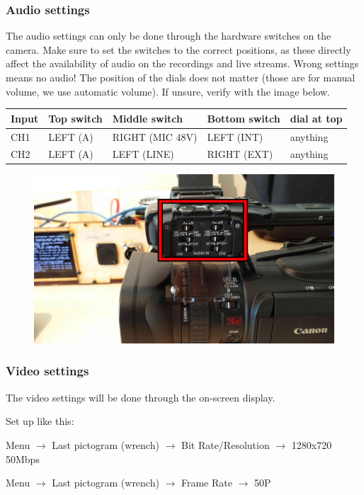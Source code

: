 \documentclass{article}
\begin{document}
\subsubsection{Audio settings}
The audio settings can only be done through the hardware switches on the camera.
Make sure to set the switches to the correct positions, as these directly affect the availability of audio on the recordings and live streams. Wrong settings means no audio!
The position of the dials does not matter (those are for manual volume, we use automatic volume).
If unsure, verify with the image below.

\begin{tabular}{| l || l | l | l | l |}
Input & Top switch & Middle switch & Bottom switch & dial at top \\ \hline
CH1 & LEFT (A) & RIGHT (MIC 48V) & LEFT (INT) & anything \\
CH2 & LEFT (A) & LEFT (LINE) & RIGHT (EXT) & anything \\
\end{tabular}

\begin{figure}[H]
  \centering
\includegraphics[width = 120mm]{Canon04.jpg}
\end{figure}

\subsubsection{Video settings}
The video settings will be done through the on-screen display.

Set up like this:

Menu $\rightarrow$ Last pictogram (wrench) $\rightarrow$ Bit Rate/Resolution $\rightarrow$ 1280x720 50Mbps

Menu $\rightarrow$ Last pictogram (wrench) $\rightarrow$ Frame Rate $\rightarrow$ 50P
\end{document}
